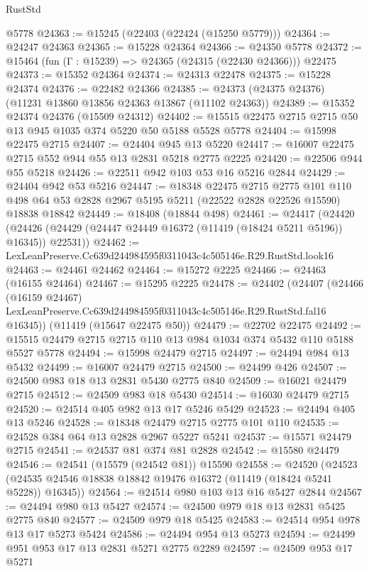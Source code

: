 \begin{lexlean}{RustStd}
\begin{coremodule}
    @5778
@24363 := @15245 (@22403 (@22424 (@15250 @5779)))
@24364 := @24247 @24363
@24365 := @15228 @24364
@24366 := @24350 @5778
@24372 := @15464 (fun (Γ : @15239) => @24365 (@24315 (@22430 @24366))) @22475
@24373 := @15352 @24364
@24374 := @24313 @22478
@24375 := @15228 @24374
@24376 := @22482 @24366
@24385 := @24373 (@24375 @24376) (@11231 @13860 @13856 @24363 @13867 (@11102 @24363))
@24389 := @15352 @24374 @24376 (@15509 @24312)
@24402 := @15515 @22475 @2715 @2715 @50 @13 @945 @1035 @374 @5220 @50 @5188 @5528 @5778
@24404 := @15998 @22475 @2715
@24407 := @24404 @945 @13 @5220
@24417 := @16007 @22475 @2715 @552 @944 @55 @13 @2831 @5218 @2775 @2225
@24420 := @22506 @944 @55 @5218
@24426 := @22511 @942 @103 @53 @16 @5216 @2844
@24429 := @24404 @942 @53 @5216
@24447 := @18348
    @22475
    @2715
    @2775
    @101
    @110
    @498
    @64
    @53
    @2828
    @2967
    @5195
    @5211
    (@22522 @2828 @22526 @15590)
    @18838
    @18842
@24449 := @18408 (@18844 @498)
@24461 := @24417
    (@24420 (@24426 (@24429 (@24447 @24449 @16372 (@11419 (@18424 @5211 @5196)) @16345)) @22531))
@24462 := LexLeanPreserve.Cc639d244984595f0311043c4c505146e.R29.RustStd.look16
@24463 := @24461 @24462
@24464 := @15272 @2225
@24466 := @24463 (@16155 @24464)
@24467 := @15295 @2225
@24478 := @24402
    (@24407
      (@24466
        (@16159 @24467)
        LexLeanPreserve.Cc639d244984595f0311043c4c505146e.R29.RustStd.fal16
        @16345))
    (@11419 (@15647 @22475 @50))
@24479 := @22702 @22475
@24492 := @15515 @24479 @2715 @2715 @110 @13 @984 @1034 @374 @5432 @110 @5188 @5527 @5778
@24494 := @15998 @24479 @2715
@24497 := @24494 @984 @13 @5432
@24499 := @16007 @24479 @2715
@24500 := @24499 @426
@24507 := @24500 @983 @18 @13 @2831 @5430 @2775 @840
@24509 := @16021 @24479 @2715
@24512 := @24509 @983 @18 @5430
@24514 := @16030 @24479 @2715
@24520 := @24514 @405 @982 @13 @17 @5246 @5429
@24523 := @24494 @405 @13 @5246
@24528 := @18348 @24479 @2715 @2775 @101 @110
@24535 := @24528 @384 @64 @13 @2828 @2967 @5227 @5241
@24537 := @15571 @24479 @2715
@24541 := @24537 @81 @374 @81 @2828
@24542 := @15580 @24479
@24546 := @24541 (@15579 (@24542 @81)) @15590
@24558 := @24520
    (@24523 (@24535 @24546 @18838 @18842 @19476 @16372 (@11419 (@18424 @5241 @5228)) @16345))
@24564 := @24514 @980 @103 @13 @16 @5427 @2844
@24567 := @24494 @980 @13 @5427
@24574 := @24500 @979 @18 @13 @2831 @5425 @2775 @840
@24577 := @24509 @979 @18 @5425
@24583 := @24514 @954 @978 @13 @17 @5273 @5424
@24586 := @24494 @954 @13 @5273
@24594 := @24499 @951 @953 @17 @13 @2831 @5271 @2775 @2289
@24597 := @24509 @953 @17 @5271

\end{coremodule}
\end{lexlean}
